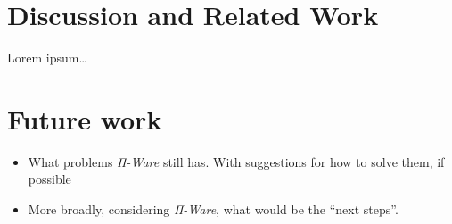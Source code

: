 \documentclass[a4paper,draft]{report}
\begin{document}
        \section{Discussion and Related Work}
        \label{sec:related-work}
            Lorem ipsum\ldots

        \section{Future work}
        \label{sec:future-work}
            \begin{itemize}
                \item What problems \emph{Π-Ware} still has.
                    \subitem With suggestions for how to solve them, if possible

                \item More broadly, considering \emph{Π-Ware}, what would be the ``next steps''.
            \end{itemize}


    \newpage
    
    
\end{document}
